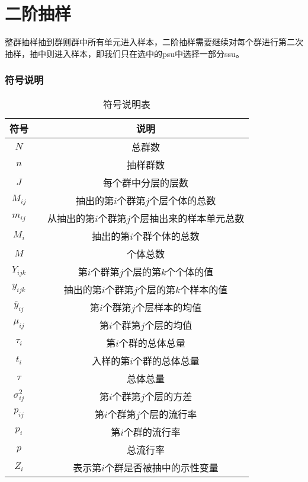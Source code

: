 \section{二阶抽样}
整群抽样抽到群则群中所有单元进入样本，二阶抽样需要继续对每个群进行第二次抽样，抽中则进入样本，即我们只在选中的psu中选择一部分ssu。
\subsubsection{符号说明}
\begin{table}[H]
	\centering
	\setlength{\tabcolsep}{25pt} %
	\begin{tabular}{ccc}
		\toprule
		符号    &  & 说明 \\
		\midrule
		$N$ & & 总群数 \\
		$n$ & & 抽样群数 \\
		$J$ & & 每个群中分层的层数 \\
		$M_{ij}$ & & 抽出的第$i$个群第$j$个层个体的总数 \\
		$m_{ij}$ & & 从抽出的第$i$个群第$j$个层抽出来的样本单元总数 \\
		$M_{i}$ & & 抽出的第$i$个群个体的总数 \\
		$M$ & & 个体总数 \\
		$Y_{ijk}$ & &第$i$个群第$j$个层的第$k$个个体的值 \\
		$y_{ijk}$ & &抽出的第$i$个群第$j$个层的第$k$个样本的值 \\
		$\bar{y}_{ij}$ & & 第$i$个群第$j$个层样本的均值 \\
		$\mu_{ij}$ & & 第$i$个群第$j$个层的均值 \\
		$\tau_i$ & & 第$i$个群的总体总量 \\
		$t_i$ & & 入样的第$i$个群的总体总量 \\
		$\tau$ & & 总体总量 \\
		$\sigma_{ij}^2$ & & 第$i$个群第$j$个层的方差 \\
		$p_{ij}$ & & 第$i$个群第$j$个层的流行率 \\
		$p_i$ & & 第$i$个群的流行率 \\
		$p$ & & 总流行率 \\
		$Z_i$ & & 表示第$i$个群是否被抽中的示性变量 \\
		\bottomrule
	\end{tabular}
	\caption{符号说明表}
\end{table}

